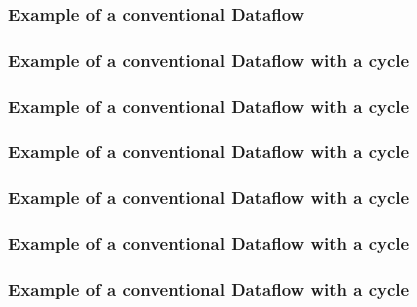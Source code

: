 \documentclass[aspectratio=169,10pt]{beamer}
\begin{document}
\begin{frame}
  \frametitle{Example of a conventional Dataflow}
  \begin{center}
    
  \end{center}
\end{frame}

\begin{frame}[fragile]
  \frametitle{Example of a conventional Dataflow with a cycle}
  \begin{center}
    
  \end{center}
\end{frame}

\begin{frame}
  \frametitle{Example of a conventional Dataflow with a cycle}
  \begin{center}
    
  \end{center}
\end{frame}

\begin{frame}
  \frametitle{Example of a conventional Dataflow with a cycle}
  \begin{center}
    
  \end{center}
\end{frame}

\begin{frame}
  \frametitle{Example of a conventional Dataflow with a cycle}
  \begin{center}
    
  \end{center}
\end{frame}

\begin{frame}
  \frametitle{Example of a conventional Dataflow with a cycle}
  \begin{center}
    
  \end{center}
\end{frame}

\begin{frame}
  \frametitle{Example of a conventional Dataflow with a cycle}
  \begin{center}
    
  \end{center}
\end{frame}
\end{document}
